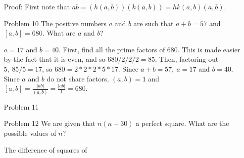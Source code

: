 \documentclass[letterpaper]{article}
\begin{document}
\begin{itemize}
            Proof: First note that \(ab = (h(a,b))(k(a,b)) = hk(a,b)(a,b)\).


      \item[Problem 10] The positive numbers \(a\) and \(b\) are such that \(a + b = 57\) and \([a, b] = 680\). What are \(a\) and \(b\)?

            \(a = 17\) and \(b = 40\). First, find all the prime factors of 680. This is made easier by the fact that it is even, and so \(680 / 2 /2 / 2 = 85\). Then, factoring out  \(5,\ 85 / 5 = 17\), so \(680 = 2*2*2*5*17\). Since \(a + b = 57,\ a = 17\) and \(b = 40\). Since \(a\) and \(b\) do not share factors, \((a,b) = 1\) and \([a, b] = \frac{|ab|}{(a,b)} = \frac{|ab|}{1} = 680\).

      \item[Problem 11]
      \item[Problem 12] We are given that \(n(n + 30)\) a perfect square. What are the possible values of \(n\)?

            The difference of squares of
\end{itemize}
\end{document}
